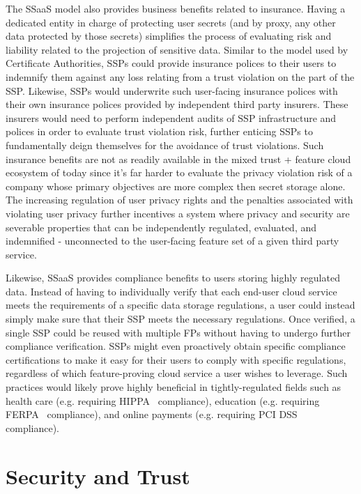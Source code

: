 The SSaaS model also provides business benefits related to
insurance. Having a dedicated entity in charge of protecting user
secrets (and by proxy, any other data protected by those secrets)
simplifies the process of evaluating risk and liability related to the
projection of sensitive data. Similar to the model used by Certificate
Authorities, SSPs could provide insurance polices to their users to
indemnify them against any loss relating from a trust violation on the
part of the SSP. Likewise, SSPs would underwrite such user-facing
insurance polices with their own insurance polices provided by
independent third party insurers. These insurers would need to perform
independent audits of SSP infrastructure and polices in order to
evaluate trust violation risk, further enticing SSPs to fundamentally
deign themselves for the avoidance of trust violations. Such insurance
benefits are not as readily available in the mixed trust + feature
cloud ecosystem of today since it's far harder to evaluate the privacy
violation risk of a company whose primary objectives are more complex
then secret storage alone. The increasing regulation of user privacy
rights and the penalties associated with violating user privacy
further incentives a system where privacy and security are severable
properties that can be independently regulated, evaluated, and
indemnified - unconnected to the user-facing feature set of a given
third party service.

Likewise, SSaaS provides compliance benefits to users storing highly
regulated data. Instead of having to individually verify that each
end-user cloud service meets the requirements of a specific data
storage regulations, a user could instead simply make sure that their
SSP meets the necessary regulations. Once verified, a single SSP could
be reused with multiple FPs without having to undergo further
compliance verification. SSPs might even proactively obtain specific
compliance certifications to make it easy for their users to comply
with specific regulations, regardless of which feature-proving cloud
service a user wishes to leverage. Such practices would likely prove
highly beneficial in tightly-regulated fields such as health care
(e.g. requiring HIPPA~\cite{hippa} compliance), education
(e.g. requiring FERPA~\cite{ferpa} compliance), and online payments
(e.g. requiring PCI DSS~\cite{pcidss} compliance).

\section{Security and Trust}
\label{chap:ssaas:trust}

